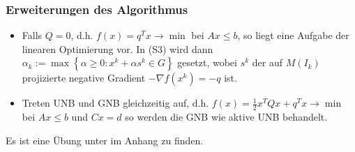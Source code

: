 \subsubsection{Erweiterungen des Algorithmus}
\begin{itemize}
  \item Falls $Q=0$, d.h. $f(x)=q^Tx\rightarrow\min$ bei $Ax\le b$, so liegt eine Aufgabe der linearen Optimierung vor. In (S3) wird dann $\alpha_k:=\max\left\{ \alpha\ge 0: x^k+\alpha
  s^k\in G \right\}$ gesetzt, wobei $s^k$ der auf $M(I_k)$ projizierte negative Gradient $-\nabla f(x^k)=-q$ ist.
  \item Treten UNB und GNB gleichzeitig auf, d.h. $f(x)=\frac12 x^TQx+q^Tx\rightarrow\min$ bei $Ax\le b$ und $Cx=d$ so werden die GNB wie aktive UNB behandelt.
\end{itemize}
Es ist eine Übung unter  im Anhang zu finden.
 
